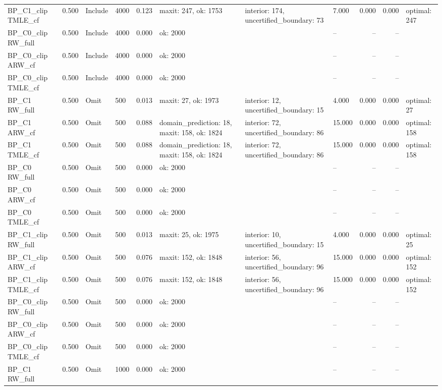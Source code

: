 \begin{tabular}{llllrlllrrl}
BP\_C1\_clip TMLE\_cf & 0.500 & Include & 4000 & 0.123 & maxit: 247, ok: 1753 & interior: 174, uncertified\_boundary: 73 & 7.000 & 0.000 & 0.000 & optimal: 247 \\
BP\_C0\_clip RW\_full & 0.500 & Include & 4000 & 0.000 & ok: 2000 &  & -- & -- & -- &  \\
BP\_C0\_clip ARW\_cf & 0.500 & Include & 4000 & 0.000 & ok: 2000 &  & -- & -- & -- &  \\
BP\_C0\_clip TMLE\_cf & 0.500 & Include & 4000 & 0.000 & ok: 2000 &  & -- & -- & -- &  \\
BP\_C1 RW\_full & 0.500 & Omit & 500 & 0.013 & maxit: 27, ok: 1973 & interior: 12, uncertified\_boundary: 15 & 4.000 & 0.000 & 0.000 & optimal: 27 \\
BP\_C1 ARW\_cf & 0.500 & Omit & 500 & 0.088 & domain\_prediction: 18, maxit: 158, ok: 1824 & interior: 72, uncertified\_boundary: 86 & 15.000 & 0.000 & 0.000 & optimal: 158 \\
BP\_C1 TMLE\_cf & 0.500 & Omit & 500 & 0.088 & domain\_prediction: 18, maxit: 158, ok: 1824 & interior: 72, uncertified\_boundary: 86 & 15.000 & 0.000 & 0.000 & optimal: 158 \\
BP\_C0 RW\_full & 0.500 & Omit & 500 & 0.000 & ok: 2000 &  & -- & -- & -- &  \\
BP\_C0 ARW\_cf & 0.500 & Omit & 500 & 0.000 & ok: 2000 &  & -- & -- & -- &  \\
BP\_C0 TMLE\_cf & 0.500 & Omit & 500 & 0.000 & ok: 2000 &  & -- & -- & -- &  \\
BP\_C1\_clip RW\_full & 0.500 & Omit & 500 & 0.013 & maxit: 25, ok: 1975 & interior: 10, uncertified\_boundary: 15 & 4.000 & 0.000 & 0.000 & optimal: 25 \\
BP\_C1\_clip ARW\_cf & 0.500 & Omit & 500 & 0.076 & maxit: 152, ok: 1848 & interior: 56, uncertified\_boundary: 96 & 15.000 & 0.000 & 0.000 & optimal: 152 \\
BP\_C1\_clip TMLE\_cf & 0.500 & Omit & 500 & 0.076 & maxit: 152, ok: 1848 & interior: 56, uncertified\_boundary: 96 & 15.000 & 0.000 & 0.000 & optimal: 152 \\
BP\_C0\_clip RW\_full & 0.500 & Omit & 500 & 0.000 & ok: 2000 &  & -- & -- & -- &  \\
BP\_C0\_clip ARW\_cf & 0.500 & Omit & 500 & 0.000 & ok: 2000 &  & -- & -- & -- &  \\
BP\_C0\_clip TMLE\_cf & 0.500 & Omit & 500 & 0.000 & ok: 2000 &  & -- & -- & -- &  \\
BP\_C1 RW\_full & 0.500 & Omit & 1000 & 0.000 & ok: 2000 &  & -- & -- & -- &  \\

\end{tabular}
